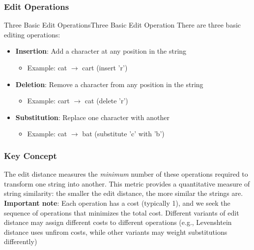 \documentclass[a4paper]{article}
\theoremstyle{definition}
\begin{document}
\subsubsection{Edit Operations}
\begin{definition}{Three Basic Edit Operations}{Three Basic Edit Operation}
There are three basic editing operations:
\begin{itemize}
  \item \textbf{Insertion}: Add a character at any position in the string 
  \begin{itemize}
    \item Example: cat \( \rightarrow \) cart (insert 'r')
  \end{itemize}
  \item \textbf{Deletion}: Remove a character from any position in the string 
  \begin{itemize}
    \item Example: cart \( \rightarrow \) cat (delete 'r')
  \end{itemize}
  \item \textbf{Substitution}: Replace one character with another 
  \begin{itemize}
    \item Example: cat \( \rightarrow \) bat (substitute 'c' with 'b')
  \end{itemize}
\end{itemize}
\subsubsection{Key Concept}
The edit distance measures the \textit{minimum} number of these operations required to transform one 
string into another. This metric provides a quantitative measure of string similarity: the smaller 
the edit distance, the more similar the strings are.
\vspace{1em}
\noindent
\newline
\textbf{Important note}: Each operation has a cost (typically 1), and we seek the sequence of operations
that minimizes the total cost. Different variants of edit distance may assign different costs 
to different operations (e.g., Levenshtein distance uses unfirom costs, while other variants may weight substitutions differently)
\end{definition}
\end{document}
